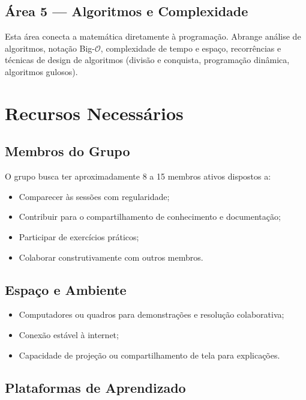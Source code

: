 \documentclass[12pt, a4paper]{article}
\begin{document}
\subsection{Área 5 --- Algoritmos e Complexidade}

Esta área conecta a matemática diretamente à programação. Abrange análise de algoritmos,
notação Big-$\mathcal{O}$, complexidade de tempo e espaço, recorrências e técnicas de
design de algoritmos (divisão e conquista, programação dinâmica, algoritmos gulosos).

\clearpage

\section{Recursos Necessários}

\subsection{Membros do Grupo}

O grupo busca ter aproximadamente 8 a 15 membros ativos dispostos a:

\begin{itemize}
  \item Comparecer às sessões com regularidade;
  \item Contribuir para o compartilhamento de conhecimento e documentação;
  \item Participar de exercícios práticos;
  \item Colaborar construtivamente com outros membros.
\end{itemize}

\subsection{Espaço e Ambiente}

\begin{itemize}
  \item Computadores ou quadros para demonstrações e resolução colaborativa;
  \item Conexão estável à internet;
  \item Capacidade de projeção ou compartilhamento de tela para explicações.
\end{itemize}

\subsection{Plataformas de Aprendizado}
\end{document}
